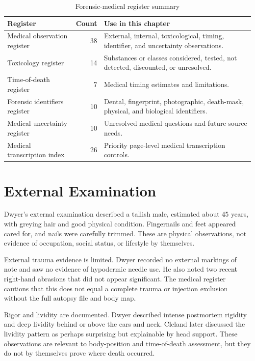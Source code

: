 \begin{table}[htbp]
\centering
\caption{Forensic-medical register summary}
\label{tab:forensic-medical-register-summary}
\begin{tabularx}{\textwidth}{>{\raggedright\arraybackslash}p{}r>{\raggedright\arraybackslash}X}
\toprule
Register & Count & Use in this chapter \\
\midrule
Medical observation register & 38 & External, internal, toxicological, timing, identifier, and uncertainty observations. \\
Toxicology register & 14 & Substances or classes considered, tested, not detected, discounted, or unresolved. \\
Time-of-death register & 7 & Medical timing estimates and limitations. \\
Forensic identifiers register & 10 & Dental, fingerprint, photographic, death-mask, physical, and biological identifiers. \\
Medical uncertainty register & 10 & Unresolved medical questions and future source needs. \\
Medical transcription index & 26 & Priority page-level medical transcription controls. \\
\bottomrule
\end{tabularx}
\end{table}

\section{External Examination}

Dwyer's external examination described a tallish male, estimated about 45 years, with greying hair and good physical condition. Fingernails and feet appeared cared for, and nails were carefully trimmed. These are physical observations, not evidence of occupation, social status, or lifestyle by themselves.

External trauma evidence is limited. Dwyer recorded no external markings of note and saw no evidence of hypodermic needle use. He also noted two recent right-hand abrasions that did not appear significant. The medical register cautions that this does not equal a complete trauma or injection exclusion without the full autopsy file and body map.

Rigor and lividity are documented. Dwyer described intense postmortem rigidity and deep lividity behind or above the ears and neck. Cleland later discussed the lividity pattern as perhaps surprising but explainable by head support. These observations are relevant to body-position and time-of-death assessment, but they do not by themselves prove where death occurred.

